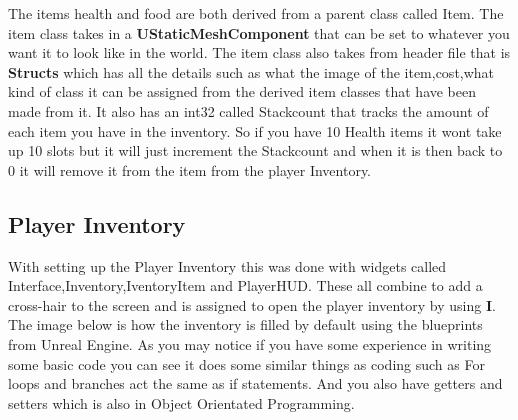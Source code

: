 The items health and food are both derived from a parent class called Item. The item class takes in a \textbf{UStaticMeshComponent} that can be set to whatever you want it to look like in the world. The item class also takes from header file that is \textbf{Structs} which has all the details such as what the image of the item,cost,what kind of class it can be assigned from the derived item classes that have been made from it. It also has an int32 called Stackcount that tracks the amount of each item you have in the inventory. So if you have 10 Health items it wont take up 10 slots but it will just increment the Stackcount and when it is then back to 0 it will remove it from the item from the player Inventory.
\subsection{Player Inventory}
With setting up the Player Inventory this was done with widgets called Interface,Inventory,IventoryItem and PlayerHUD. These all combine to add a cross-hair to the screen and is assigned to open the player inventory by using \textbf{I}. The image below is how the inventory is filled by default using the blueprints from Unreal Engine. As you may notice if you have some experience in writing some basic code you can see it does some similar things as coding such as For loops and branches act the same as if statements. And you also have getters and setters which is also in Object Orientated Programming.
